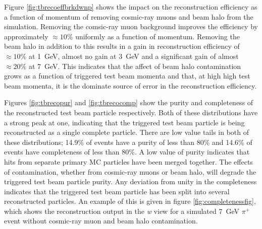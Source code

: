 Figure \ref{fig:tbrecoeffbrkdwnp} shows the impact on the reconstruction efficiency as a function of momentum of removing cosmic-ray muons and beam halo from the simulation.  Removing the comsic-ray muon background improves the efficiency by approximately $\approx 10\%$ uniformly as a function of momentum.  Removing the beam halo in addition to this results in a gain in reconstruction efficiency of $\approx 10\%$ at 1~GeV, almost no gain at 3~GeV and a significant gain of almost $\approx 20\%$ at 7~GeV.  This indicates that the affect of beam halo contamination grows as a function of triggered test beam momenta and that, at high high test beam momenta, it is the dominate source of error in the reconstruction efficiency.  

Figures \ref{fig:tbrecopur} and \ref{fig:tbrecocomp} show the purity and completeness of the reconstructed test beam particle respectively.  Both of these distributions have a strong peak at one, indicating that the triggered test beam particle is being reconstructed as a single complete particle.  There are low value tails in both of these distributions; 14.9\% of events have a purity of less than 80\% and 14.6\% of events have completeness of less than 80\%.  A low value of purity indicates that hits from separate primary MC particles have been merged together.  The effects of contamination, whether from cosmic-ray muons or beam halo, will degrade the triggered test beam particle purity.  Any deviation from unity in the completeness indicates that the triggered test beam particle has been split into several reconstructed particles.  An example of this is given in figure \ref{fig:completenessfig}, which shows the reconstruction output in the \textit{w} view for a simulated 7~GeV $\pi^{+}$ event without cosmic-ray muon and beam halo contamination.  

